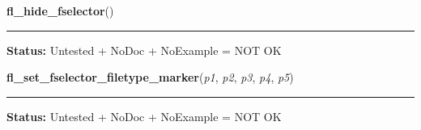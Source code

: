     \vspace{0.5ex}

\hspace{.8\funcindent}\begin{boxedminipage}{\funcwidth}

    \raggedright \textbf{fl\_hide\_fselector}()

    \vspace{-1.5ex}

    \rule{\textwidth}{0.5\fboxrule}
\setlength{\parskip}{2ex}
\setlength{\parskip}{1ex}
\textbf{Status:} Untested + NoDoc + NoExample = NOT OK



    \end{boxedminipage}

    \label{xformslib:library:fl_set_fselector_filetype_marker}

    \vspace{0.5ex}

\hspace{.8\funcindent}\begin{boxedminipage}{\funcwidth}

    \raggedright \textbf{fl\_set\_fselector\_filetype\_marker}(\textit{p1}, \textit{p2}, \textit{p3}, \textit{p4}, \textit{p5})

    \vspace{-1.5ex}

    \rule{\textwidth}{0.5\fboxrule}
\setlength{\parskip}{2ex}
\setlength{\parskip}{1ex}
\textbf{Status:} Untested + NoDoc + NoExample = NOT OK



    \end{boxedminipage}

    \label{xformslib:library:fl_set_fselector_title}

    \vspace{0.5ex}

